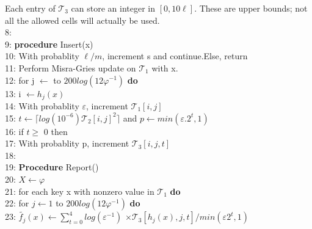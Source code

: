 \documentclass{article}
\renewcommand{\phi}{\varphi}
\begin{document}
\begin{multicols}{2}
{\begin{algorithm}[H]
    	\hspace*{.5cm}Each entry of $\mathcal{T}_{3}$ can store an integer in \hspace*{.4cm} $[0,10\ell]$. These are upper bounds; not all \hspace*{.5cm}the allowed cells will actually be used.\\
    	8:\\
    	9: \textbf{procedure} Insert(x)\\
    	10: With probablity $\ell/m $, increment s and \hspace*{.6cm}continue.Else, return\\
    	11: Perform Misra-Gries update on $\mathcal{T}_{1}$ with x.\\
    	12: \hspace{.5cm}for j $\leftarrow$ to $200log(12\varphi^{-1})$ \textbf{do}\\
    	13: \hspace{1cm}i $\leftarrow h_j(x)$\\
    	14: \hspace{1cm}With probablity $\varepsilon$, increment $\mathcal{T}_{1}[i,j]$\\
    	15: \hspace{1cm}$t\leftarrow \lceil log(10^{-6}) \mathcal{T}_{2}[i,j]^{2}\rceil$ and
    	\hspace*{1.5cm}$p \leftarrow min(\varepsilon.2^{t},1)$\\
    	16: \hspace{1cm}if $t\geqslant$ 0 then\\
    	17:     \hspace{1.3cm}With probablity p, increment \hspace*{1.8cm}$\mathcal{T}_{3}[i,j,t]$\\
    	18:\\
    	19: \textbf{Procedure} Report()\\
    	20: \hspace*{.3cm}$X \leftarrow \phi$\\
    	21: \hspace*{.3cm}for each key x with nonzero value in $\mathcal{T}_{1}$ \textbf{do}\\
    	22: \hspace*{.6cm}for $j\leftarrow 1$ to $200log(12\varphi^{-1})$ \textbf{do}\\
    	23: \hspace*{1cm}$\tilde{f_{j}}(x) \leftarrow \sum_{t=0}^4log(\varepsilon^{-1})$
    	\hspace*{3cm} $\times\mathcal{T}_{3}[h_{j}(x),j,t]/min(\varepsilon2^{t},1)$\\

\end{algorithm}}
\end{multicols}
\end{document}
